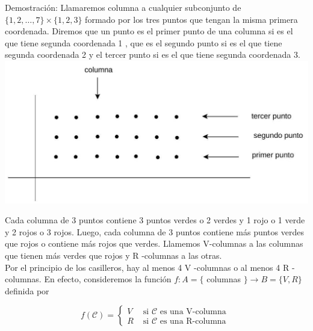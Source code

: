\documentclass[10pt]{article}
\begin{document}
Demostración: Llamaremos columna a cualquier subconjunto de $\{1,2, \ldots, 7\} \times\{1,2,3\}$ formado por los tres puntos que tengan la misma primera coordenada. Diremos que un punto es el primer punto de una columna si es el que tiene segunda coordenada 1 , que es el segundo punto si es el que tiene segunda coordenada 2 y el tercer punto si es el que tiene segunda coordenada 3.\\
\includegraphics[max width=\textwidth, center]{2025_09_05_b69e29efaf9a6d2aa81ag-09}

Cada columna de 3 puntos contiene 3 puntos verdes o 2 verdes y 1 rojo o 1 verde y 2 rojos o 3 rojos. Luego, cada columna de 3 puntos contiene más puntos verdes que rojos o contiene más rojos que verdes. Llamemos V-columnas a las columnas que tienen más verdes que rojos y R -columnas a las otras.\\
Por el principio de los casilleros, hay al menos 4 V -columnas o al menos 4 R -columnas. En efecto, consideremos la función $f: A=\{$ columnas $\} \longrightarrow B=\{V, R\}$ definida por

$$
f(\mathcal{C})= \begin{cases}V & \text { si } \mathcal{C} \text { es una V-columna } \\ R & \text { si } \mathcal{C} \text { es una R-columna }\end{cases}
$$
\end{document}
